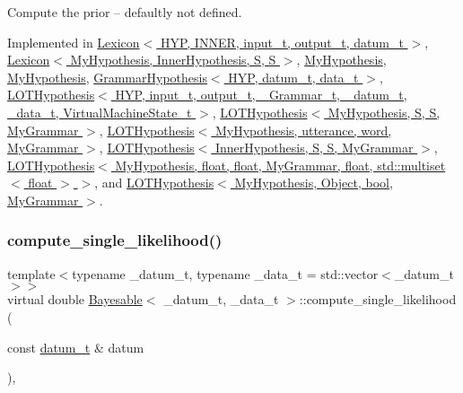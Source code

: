 Compute the prior -- defaultly not defined. 



Implemented in \hyperlink{class_lexicon_a2e099a68dd08d62897b40647f92eba1c}{Lexicon$<$ H\+Y\+P, I\+N\+N\+E\+R, input\+\_\+t, output\+\_\+t, datum\+\_\+t $>$}, \hyperlink{class_lexicon_a2e099a68dd08d62897b40647f92eba1c}{Lexicon$<$ My\+Hypothesis, Inner\+Hypothesis, S, S $>$}, \hyperlink{class_my_hypothesis_ab092094c5fc31730de4f40609220bb18}{My\+Hypothesis}, \hyperlink{class_my_hypothesis_a67477313b60b21158bbfaad35dc5d275}{My\+Hypothesis}, \hyperlink{class_grammar_hypothesis_a36c0ec17fb79f56fb4c71ed58f2625f6}{Grammar\+Hypothesis$<$ H\+Y\+P, datum\+\_\+t, data\+\_\+t $>$}, \hyperlink{class_l_o_t_hypothesis_af215c4833e81984364703b2e4cb78dc7}{L\+O\+T\+Hypothesis$<$ H\+Y\+P, input\+\_\+t, output\+\_\+t, \+\_\+\+Grammar\+\_\+t, \+\_\+datum\+\_\+t, \+\_\+data\+\_\+t, Virtual\+Machine\+State\+\_\+t $>$}, \hyperlink{class_l_o_t_hypothesis_af215c4833e81984364703b2e4cb78dc7}{L\+O\+T\+Hypothesis$<$ My\+Hypothesis, S, S, My\+Grammar $>$}, \hyperlink{class_l_o_t_hypothesis_af215c4833e81984364703b2e4cb78dc7}{L\+O\+T\+Hypothesis$<$ My\+Hypothesis, utterance, word, My\+Grammar $>$}, \hyperlink{class_l_o_t_hypothesis_af215c4833e81984364703b2e4cb78dc7}{L\+O\+T\+Hypothesis$<$ Inner\+Hypothesis, S, S, My\+Grammar $>$}, \hyperlink{class_l_o_t_hypothesis_af215c4833e81984364703b2e4cb78dc7}{L\+O\+T\+Hypothesis$<$ My\+Hypothesis, float, float, My\+Grammar, float, std\+::multiset$<$ float $>$ $>$}, and \hyperlink{class_l_o_t_hypothesis_af215c4833e81984364703b2e4cb78dc7}{L\+O\+T\+Hypothesis$<$ My\+Hypothesis, Object, bool, My\+Grammar $>$}.

\mbox{\label{class_bayesable_a87d195bfe5cdf6d293dae5fc01ae2e6c}} 
\subsubsection{\texorpdfstring{compute\+\_\+single\+\_\+likelihood()}{compute\_single\_likelihood()}}
{\footnotesize\ttfamily template$<$typename \+\_\+datum\+\_\+t, typename \+\_\+data\+\_\+t = std\+::vector$<$\+\_\+datum\+\_\+t$>$$>$ \\
virtual double \hyperlink{class_bayesable}{Bayesable}$<$ \+\_\+datum\+\_\+t, \+\_\+data\+\_\+t $>$\+::compute\+\_\+single\+\_\+likelihood (\begin{DoxyParamCaption}\item[{const \hyperlink{class_bayesable_a9f1a6c0cd7855550fa10b1a8f13a5867}{datum\+\_\+t} \&}]{datum }\end{DoxyParamCaption})\hspace{0.3cm}{\ttfamily [inline]}, {\ttfamily [virtual]}}



